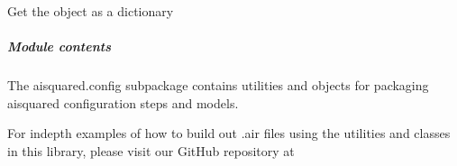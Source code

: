 \documentclass[letterpaper,10pt,english]{sphinxmanual}
\begin{document}
\begin{fulllineitems}
\begin{fulllineitems}
\label{\detokenize{aisquared.config:aisquared.config.ModelConfiguration.ModelConfiguration.to_dict}}
\pysigstartsignatures
{}
\pysigstopsignatures
\sphinxAtStartPar
Get the object as a dictionary

\end{fulllineitems}


\begin{fulllineitems}
\label{\detokenize{aisquared.config:aisquared.config.ModelConfiguration.ModelConfiguration.url}}
\pysigstartsignatures
{}
\pysigstopsignatures
\end{fulllineitems}


\begin{fulllineitems}
\label{\detokenize{aisquared.config:aisquared.config.ModelConfiguration.ModelConfiguration.version}}
\pysigstartsignatures
{}
\pysigstopsignatures
\end{fulllineitems}


\end{fulllineitems}



\subparagraph{Module contents}
\label{\detokenize{aisquared.config:module-aisquared.config}}\label{\detokenize{aisquared.config:module-contents}}
\sphinxAtStartPar
The aisquared.config subpackage contains utilities and objects for packaging aisquared configuration steps and models.

\sphinxAtStartPar
For in\sphinxhyphen{}depth examples of how to build out .air files using the utilities and classes in this library, please visit our
GitHub repository at 
\end{document}
